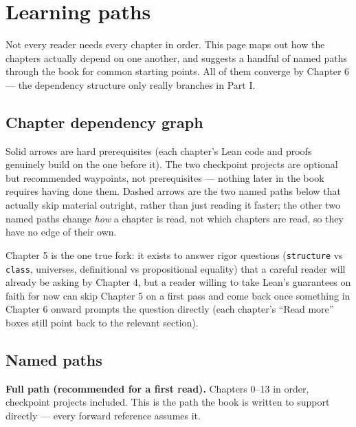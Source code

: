 \chapter*{Learning paths}
\setcounter{section}{0}\label{sec:root:learning-paths:1}

Not every reader needs every chapter in order. This page maps out how the chapters actually depend on one another, and suggests a handful of named paths through the book for common starting points. All of them converge by Chapter 6 --- the dependency structure only really branches in Part I.

\section*{Chapter dependency graph}
\label{sec:root:learning-paths:2}

\begin{center}

\end{center}

Solid arrows are hard prerequisites (each chapter's Lean code and proofs genuinely build on the one before it). The two checkpoint projects are optional but recommended waypoints, not prerequisites --- nothing later in the book requires having done them. Dashed arrows are the two named paths below that actually skip material outright, rather than just reading it faster; the other two named paths change \emph{how} a chapter is read, not which chapters are read, so they have no edge of their own.

Chapter 5 is the one true fork: it exists to answer rigor questions (\texttt{structure} vs \texttt{class}, universes, definitional vs propositional equality) that a careful reader will already be asking by Chapter 4, but a reader willing to take Lean's guarantees on faith for now can skip Chapter 5 on a first pass and come back once something in Chapter 6 onward prompts the question directly (each chapter's ``Read more'' boxes still point back to the relevant section).

\section*{Named paths}
\label{sec:root:learning-paths:3}

\textbf{Full path (recommended for a first read).} Chapters 0--13 in order, checkpoint projects included. This is the path the book is written to support directly --- every forward reference assumes it.

